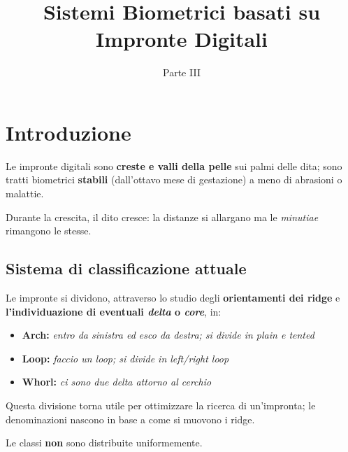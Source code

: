 \documentclass{report}
\title{Sistemi Biometrici basati su Impronte Digitali}
\date{Parte III}
\begin{document}
\maketitle

\tableofcontents
\newpage


\chapter{Introduzione}

Le impronte digitali sono \textbf{creste e valli della pelle} sui palmi delle dita;
sono tratti biometrici \textbf{stabili} (dall'ottavo mese di gestazione) a meno di abrasioni
o malattie.

\noindent Durante la crescita, il dito cresce: la distanze si allargano ma le 
\textit{minutiae} rimangono le stesse.

\section{Sistema di classificazione attuale}

Le impronte si dividono, attraverso lo studio degli \textbf{orientamenti dei ridge} e \textbf{l'individuazione
di eventuali \textit{delta} o \textit{core}}, in:
\begin{itemize}
    \item \textbf{Arch:} \textit{entro da sinistra ed esco da destra; si divide in plain e tented}
    \item \textbf{Loop:} \textit{faccio un loop; si divide in left/right loop}
    \item \textbf{Whorl:} \textit{ci sono due delta attorno al cerchio}
\end{itemize}
Questa divisione torna utile per ottimizzare la ricerca di un'impronta; le denominazioni
nascono in base a come si muovono i ridge.

\noindent Le classi \textbf{non} sono distribuite uniformemente.
\end{document}
